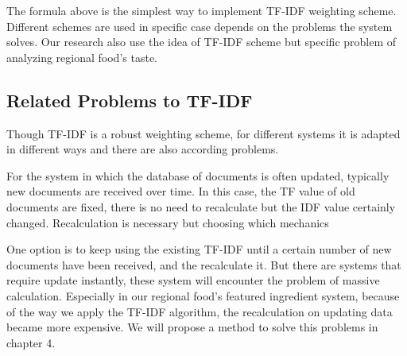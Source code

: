 The formula above is the simplest way to implement TF-IDF weighting scheme. Different schemes are used in specific case depends on the problems the system solves. Our research also use the idea of TF-IDF scheme but specific problem of analyzing regional food's taste.  


\subsection{Related Problems to TF-IDF}\label{sec:bg_prob}

Though TF-IDF is a robust weighting scheme, for different systems it is adapted in different ways and there are also according problems. 

For the system in which the database of documents is often updated, typically new documents are received over time. In this case, the TF value of old documents are fixed, there is no need to recalculate but the IDF value certainly changed. Recalculation is necessary but choosing which mechanics 

One option is to keep using the existing TF-IDF until a certain number of new documents have been received, and the recalculate it. But there are systems that require update instantly, these system will encounter the problem of massive calculation. Especially in our regional food's featured ingredient system, because of the way we apply the TF-IDF algorithm, the recalculation on updating data became more expensive. We will propose a method to solve this problems in chapter 4.     

